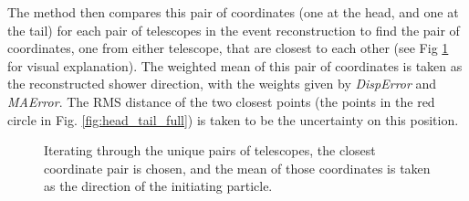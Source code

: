 \documentclass[main.tex]{subfiles}
\begin{document}
The method then compares this pair of coordinates (one at the head, and one at the tail) for each pair of telescopes in the event reconstruction to find the pair of coordinates, one from either telescope, that are closest to each other (see Fig \ref{fig:head_tail} for visual explanation). The weighted mean of this pair of coordinates is taken as the reconstructed shower direction, with the weights given by {\it DispError} and {\it MAError}. The RMS distance of the two closest points (the points in the red circle in Fig. \ref{fig:head_tail_full}) is taken to be the uncertainty on this position.
\begin{figure}[htbp]
  \centering
{}
  \caption[Combining multiple telescopes in \disp reconstruction.]{Iterating through the unique pairs of telescopes, the closest coordinate pair is chosen, and the mean of those coordinates is taken as the direction of the initiating particle.}
  \label{fig:head_tail}
\end{figure}
\end{document}
